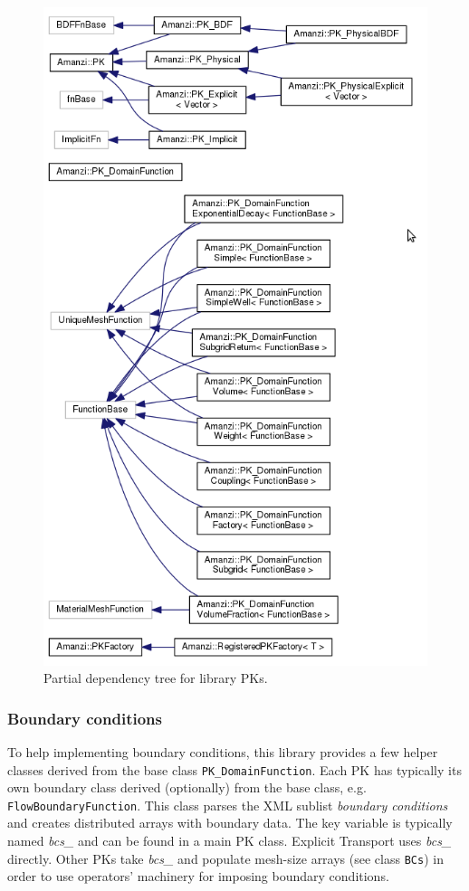 \begin{figure}[h!]
\begin{center}
\includegraphics[height=0.9\textheight]{figs/pks.png}
\caption{Partial dependency tree for library PKs.\label{fig:pks}}
\end{center}
\end{figure}


\subsubsection{Boundary conditions}
To help implementing boundary conditions, this library provides a few helper 
classes derived from the base class {\tt PK\_DomainFunction}.
Each PK has typically its own boundary class derived (optionally) from the
base class, e.g. {\tt FlowBoundaryFunction}.
This class parses the XML sublist {\it boundary conditions} and creates 
distributed arrays with boundary data. The key variable is typically named 
{\it bcs\_} and can be found in a main PK class.
Explicit Transport uses {\it bcs\_} directly.
Other PKs take {\it bcs\_} and populate mesh-size arrays (see class {\tt BCs})
in order to use operators' machinery for imposing boundary conditions.

